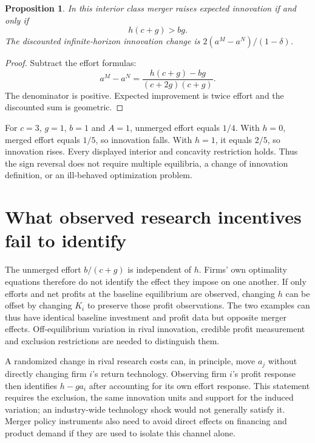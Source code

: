 \documentclass[11pt]{article}
\newtheorem{proposition}{Proposition}
\begin{document}
\begin{proposition}
In this interior class merger raises expected innovation if and only if
\[
 h(c+g)>bg.
\]
The discounted infinite-horizon innovation change is
$2(a^M-a^N)/(1-\delta)$.
\end{proposition}
\begin{proof}
Subtract the effort formulas:
\[
 a^M-a^N=\frac{h(c+g)-bg}{(c+2g)(c+g)}.
\]
The denominator is positive. Expected improvement is twice effort and the discounted sum is geometric.
\end{proof}
For $c=3$, $g=1$, $b=1$ and $A=1$, unmerged effort equals $1/4$. With $h=0$, merged effort equals $1/5$, so innovation falls. With $h=1$, it equals $2/5$, so innovation rises. Every displayed interior and concavity restriction holds. Thus the sign reversal does not require multiple equilibria, a change of innovation definition, or an ill-behaved optimization problem.

\section{What observed research incentives fail to identify}
The unmerged effort $b/(c+g)$ is independent of $h$. Firms' own optimality equations therefore do not identify the effect they impose on one another. If only efforts and net profits at the baseline equilibrium are observed, changing $h$ can be offset by changing $K_i$ to preserve those profit observations. The two examples can thus have identical baseline investment and profit data but opposite merger effects. Off-equilibrium variation in rival innovation, credible profit measurement and exclusion restrictions are needed to distinguish them.

A randomized change in rival research costs can, in principle, move $a_j$ without directly changing firm $i$'s return technology. Observing firm $i$'s profit response then identifies $h-ga_i$ after accounting for its own effort response. This statement requires the exclusion, the same innovation units and support for the induced variation; an industry-wide technology shock would not generally satisfy it. Merger policy instruments also need to avoid direct effects on financing and product demand if they are used to isolate this channel alone.
\end{document}
